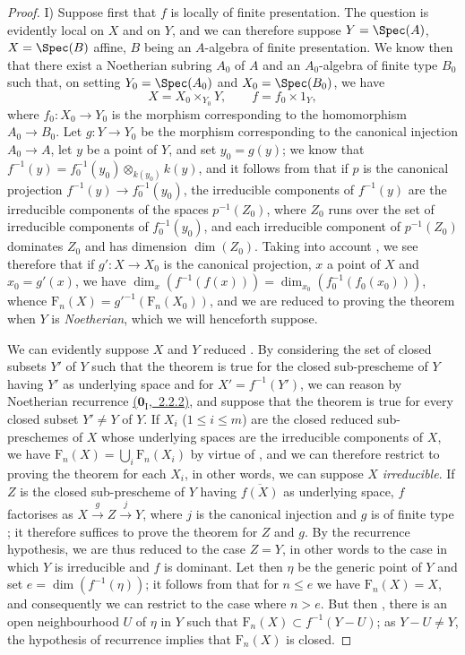\begin{proof}
I) Suppose first that $f$ is locally of finite presentation.
The question is evidently local on $X$ and on $Y$, and we can therefore suppose $Y=\Spec(A)$, $X=\Spec(B)$ affine, $B$ being an $A$-algebra of finite presentation.
We know then  that there exist a Noetherian subring $A_0$ of $A$ and an $A_0$-algebra of finite type $B_0$ such that, on setting $Y_0=\Spec(A_0)$ and $X_0=\Spec(B_0)$, we have
\[
X=X_0\times_{Y_0}Y,\qquad f=f_0\times 1_Y,
\]
where $f_0:X_0\to Y_0$ is the morphism corresponding to the homomorphism $A_0\to B_0$.
Let $g:Y\to Y_0$ be the morphism corresponding to the canonical injection $A_0\to A$, let $y$ be a point of $Y$, and set $y_0=g(y)$; we know that $f^{-1}(y)=f_0^{-1}(y_0)\otimes_{k(y_0)}k(y)$, and it follows from  that if $p$ is the canonical projection $f^{-1}(y)\to f_0^{-1}(y_0)$, the irreducible components of $f^{-1}(y)$ are the irreducible components of the spaces $p^{-1}(Z_0)$, where $Z_0$ runs over the set of irreducible components of $f_0^{-1}(y_0)$, and each irreducible component of $p^{-1}(Z_0)$ dominates $Z_0$ and has dimension $\dim(Z_0)$.
Taking into account , we see therefore that if $g':X\to X_0$ is the canonical projection, $x$ a point of $X$ and $x_0=g'(x)$, we have $\dim_x(f^{-1}(f(x)))=\dim_{x_0}(f_0^{-1}(f_0(x_0)))$, whence $\mathrm{F}_n(X)={g'}^{-1}(\mathrm{F}_n(X_0))$, and we are reduced to proving the theorem when $Y$ is \emph{Noetherian}, which we will henceforth suppose.

We can evidently suppose $X$ and $Y$ reduced .
By considering the set of closed subsets $Y'$ of $Y$ such that the theorem is true for the closed sub-prescheme of $Y$ having $Y'$ as underlying space and for $X'=f^{-1}(Y')$, we can reason by Noetherian recurrence \hyperref[0.2.2.2]{($\mathbf{0}_{\mathrm{I}}$,~2.2.2)}, and suppose that the theorem is true for every closed subset $Y'\neq Y$ of $Y$.
If $X_i$ ($1\leq i\leq m$) are the closed reduced sub-preschemes of $X$ whose underlying spaces are the irreducible components of $X$, we have $\mathrm{F}_n(X)=\bigcup_i\mathrm{F}_n(X_i)$ by virtue of , and we can therefore restrict to proving the theorem for each $X_i$, in other words, we can suppose $X$ \emph{irreducible}.
If $Z$ is the closed sub-prescheme of $Y$ having $\overline{f(X)}$ as underlying space, $f$ factorises as $X\xrightarrow{g}Z\xrightarrow{j}Y$, where $j$ is the canonical injection  and $g$ is of finite type ; it therefore suffices to prove the theorem for $Z$ and $g$. By the recurrence hypothesis, we are thus reduced to the case $Z=Y$, in other words to the case in which $Y$ is irreducible and $f$ is dominant.
Let then $\eta$ be the generic point of $Y$ and set $e=\dim(f^{-1}(\eta))$; it follows from  that for $n\leq e$ we have $\mathrm{F}_n(X)=X$, and consequently we can restrict to the case where $n>e$.
But then , there is an open neighbourhood $U$ of $\eta$ in $Y$ such that $\mathrm{F}_n(X)\subset f^{-1}(Y-U)$; as $Y-U\neq Y$, the hypothesis of recurrence implies that $\mathrm{F}_n(X)$ is closed.


\end{proof}
